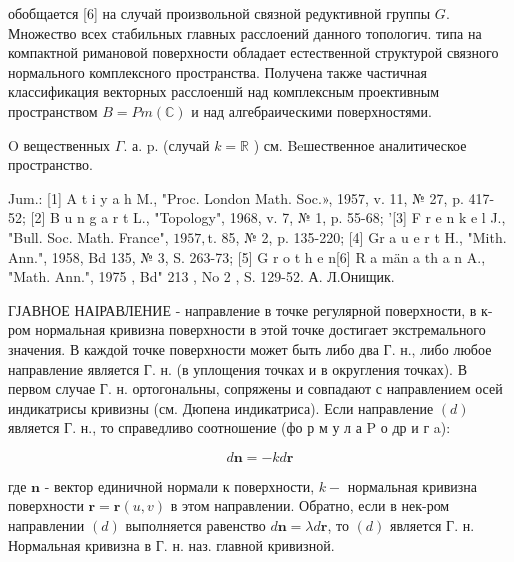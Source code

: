\documentclass[10pt]{article}
\begin{document}
обобщается [6] на случай произвольной связной редуктивной группы $G$. Множество всех стабильных главных расслоений данного топологич. типа на компактной римановой поверхности обладает естественной структурой связного нормального комплексного пространства. Получена также частичная классификация векторных расслоеншй над комплексным проективным пространством $B=P m(\mathbb{C})$ и над алгебраическими поверхностями.



$\mathrm{O}$ вещественных $\Gamma$. а. p. (случай $k=\mathbb{R}$ ) см. Beшественное аналитическое пространство.



Jum.: [1] A t i y a h M., "Proc. London Math. Soc.», 1957, v. 11, № 27, p. 417-52; [2] B u n g a r t L., "Topology", 1968, v. 7, № 1, p. 55-68; '[3] F r e n k e l J., "Bull. Soc. Math. France", $1957, \mathrm{t}$. 85, № 2, p. 135-220; [4] Gr a u e r t $\mathrm{H}$., "Mith. Ann.", 1958, Bd 135, № 3, S. 263-73; [5] G r o t h e n[6] R a män a $\mathrm{t} \mathrm{h}$ a n A., "Math. Ann.", 1975 , Bd" 213 , No 2 , S. 129-52. А. Л.Онищик.



ГЈАВНОЕ НАІРАВЛЕНИЕ - направление в точке регулярной поверхности, в к-ром нормальная кривизна поверхности в этой точке достигает экстремального значения. В каждой точке поверхности может быть либо два Г. н., либо любое направление является Г. н. (в уплощения точках и в округления точках). В первом случае Г. н. ортогональны, сопряжены и совпадают с направлением осей индикатрисы кривизны (см. Дюпена индикатриса). Если направление $(d)$ является Г. н., то справедливо соотношение (фо р м у л а $\mathrm{P}$ о др и г a):



\[

d \boldsymbol{n}=-k d \boldsymbol{r}

\]



где $\boldsymbol{n}$ - вектор единичной нормали к поверхности, $k-$ нормальная кривизна поверхности $\boldsymbol{r}=\boldsymbol{r}(u, v)$ в этом направлении. Обратно, если в нек-ром направлении $(d)$ выполняется равенство $d \boldsymbol{n}=\lambda d \boldsymbol{r}$, то $(d)$ является Г. н. Нормальная кривизна в Г. н. наз. главной кривизной.
\end{document}
